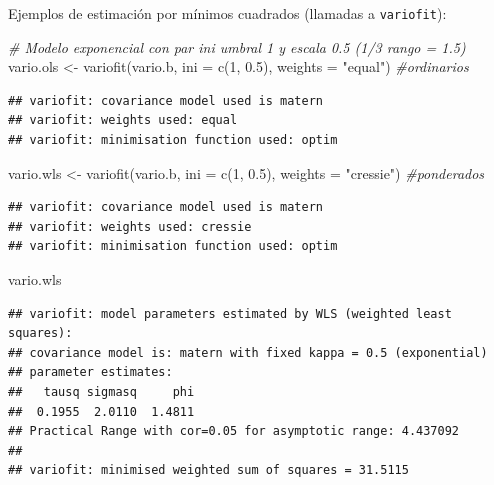 \documentclass[
  spanish,
]{book}
\newenvironment{Shaded}{\begin{snugshade}}{\end{snugshade}}
\newcommand{\AttributeTok}[1]{\textcolor[rgb]{0.77,0.63,0.00}{#1}}
\newcommand{\CommentTok}[1]{\textcolor[rgb]{0.56,0.35,0.01}{\textit{#1}}}
\newcommand{\DecValTok}[1]{\textcolor[rgb]{0.00,0.00,0.81}{#1}}
\newcommand{\FloatTok}[1]{\textcolor[rgb]{0.00,0.00,0.81}{#1}}
\newcommand{\FunctionTok}[1]{\textcolor[rgb]{0.00,0.00,0.00}{#1}}
\newcommand{\NormalTok}[1]{#1}
\newcommand{\OtherTok}[1]{\textcolor[rgb]{0.56,0.35,0.01}{#1}}
\newcommand{\StringTok}[1]{\textcolor[rgb]{0.31,0.60,0.02}{#1}}
\theoremstyle{break}
\theoremstyle{definition}
\theoremstyle{definition}
\theoremstyle{definition}
\theoremstyle{definition}
\theoremstyle{remark}
\begin{document}
Ejemplos de estimación por mínimos cuadrados (llamadas a \texttt{variofit}):

\begin{Shaded}
\begin{Highlighting}[]
\CommentTok{\#   Modelo exponencial con par ini umbral 1 y escala 0.5 (1/3 rango = 1.5)}
\NormalTok{vario.ols }\OtherTok{\textless{}{-}} \FunctionTok{variofit}\NormalTok{(vario.b, }\AttributeTok{ini =} \FunctionTok{c}\NormalTok{(}\DecValTok{1}\NormalTok{, }\FloatTok{0.5}\NormalTok{), }\AttributeTok{weights =} \StringTok{"equal"}\NormalTok{)  }\CommentTok{\#ordinarios}
\end{Highlighting}
\end{Shaded}

\begin{verbatim}
## variofit: covariance model used is matern 
## variofit: weights used: equal 
## variofit: minimisation function used: optim
\end{verbatim}

\begin{Shaded}
\begin{Highlighting}[]
\NormalTok{vario.wls }\OtherTok{\textless{}{-}} \FunctionTok{variofit}\NormalTok{(vario.b, }\AttributeTok{ini =} \FunctionTok{c}\NormalTok{(}\DecValTok{1}\NormalTok{, }\FloatTok{0.5}\NormalTok{), }\AttributeTok{weights =} \StringTok{"cressie"}\NormalTok{)  }\CommentTok{\#ponderados}
\end{Highlighting}
\end{Shaded}

\begin{verbatim}
## variofit: covariance model used is matern 
## variofit: weights used: cressie 
## variofit: minimisation function used: optim
\end{verbatim}

\begin{Shaded}
\begin{Highlighting}[]
\NormalTok{vario.wls}
\end{Highlighting}
\end{Shaded}

\begin{verbatim}
## variofit: model parameters estimated by WLS (weighted least squares):
## covariance model is: matern with fixed kappa = 0.5 (exponential)
## parameter estimates:
##   tausq sigmasq     phi 
##  0.1955  2.0110  1.4811 
## Practical Range with cor=0.05 for asymptotic range: 4.437092
## 
## variofit: minimised weighted sum of squares = 31.5115
\end{verbatim}
\end{document}
